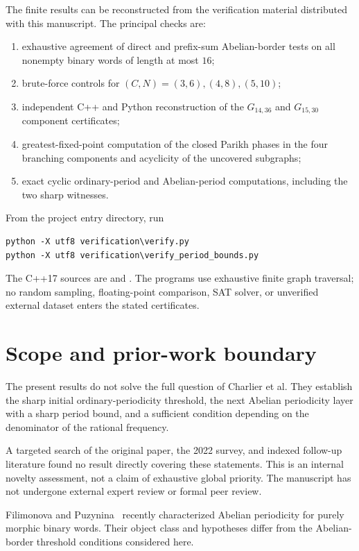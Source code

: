 \documentclass[11pt]{article}
\begin{document}
The finite results can be reconstructed from the verification material
distributed with this manuscript. The principal checks are:
\begin{enumerate}
\item exhaustive agreement of direct and prefix-sum Abelian-border tests on
all nonempty binary words of length at most $16$;
\item brute-force controls for $(C,N)=(3,6),(4,8),(5,10)$;
\item independent C++ and Python reconstruction of the $G_{14,36}$ and
$G_{15,30}$ component certificates;
\item greatest-fixed-point computation of the closed Parikh phases in the
four branching components and acyclicity of the uncovered subgraphs;
\item exact cyclic ordinary-period and Abelian-period computations, including
the two sharp witnesses.
\end{enumerate}

From the project entry directory, run
\begin{verbatim}
python -X utf8 verification\verify.py
python -X utf8 verification\verify_period_bounds.py
\end{verbatim}
The C++17 sources are  and
. The programs use exhaustive
finite graph traversal; no random sampling, floating-point comparison, SAT
solver, or unverified external dataset enters the stated certificates.

\section{Scope and prior-work boundary}

The present results do not solve the full question of Charlier et al. They
establish the sharp initial ordinary-periodicity threshold, the next Abelian
periodicity layer with a sharp period bound, and a sufficient condition
depending on the denominator of the rational frequency.

A targeted search of the original paper, the 2022 survey, and indexed
follow-up literature found no result directly covering these statements.
This is an internal novelty assessment, not a claim of exhaustive global
priority. The manuscript has not undergone external expert review or formal
peer review.

Filimonova and Puzynina~\cite{FilimonovaPuzynina} recently characterized
Abelian periodicity for purely morphic binary words. Their object class and
hypotheses differ from the Abelian-border threshold conditions considered
here.
\end{document}
